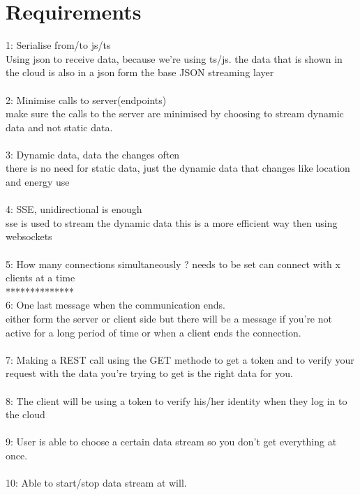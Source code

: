 \documentclass{article}
\begin{document}
\section{Requirements}\label{sec:requirements}
1: Serialise from/to js/ts\\
Using json to receive data, because we're using ts/js.
the data that is shown in the cloud is also in a json form 
the base JSON streaming layer\\
\\
2: Minimise calls to server(endpoints)\\
make sure the calls to the server are minimised by choosing to stream dynamic data and not static data.\\
\\
3: Dynamic data, data the changes often\\
there is no need for static data, just the dynamic data that changes like location and energy use \\
\\
4: SSE, unidirectional is enough\\
sse is used to stream the dynamic data this is a more efficient way then using websockets\\
\\
5: How many connections simultaneously ? needs to be set
can connect with x clients at a time\\ **************
\\
6: One last message when the communication ends. \\
either form the server or client side but there will be a message if you're not active for a long period of time or when a client ends the connection. \\
\\
7: Making a REST call using the GET methode to get a token and to verify your request with the data you're trying to get is the right data for you.\\
\\
8: The client will be using a token to verify his/her identity when they log in to the cloud\\
\\
9: User is able to choose a certain data stream so you don't get everything at once.\\
\\
10: Able to start/stop data stream at will.\\
\\
\end{document}
